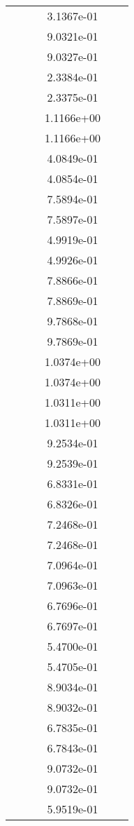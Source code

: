 \begin{xltabular}{\textwidth}{r|rS[table-format=1.3e+2]S[table-format=1.4e+2]S[table-format=1.4e+2]S[table-format=-1.5]}
&  &  & 3.1367e-01 & & \\
&  &  & 9.0321e-01 & & \\
&  &  & 9.0327e-01 & & \\
&  &  & 2.3384e-01 & & \\
&  &  & 2.3375e-01 & & \\
&  &  & 1.1166e+00 & & \\
&  &  & 1.1166e+00 & & \\
&  &  & 4.0849e-01 & & \\
&  &  & 4.0854e-01 & & \\
&  &  & 7.5894e-01 & & \\
&  &  & 7.5897e-01 & & \\
&  &  & 4.9919e-01 & & \\
&  &  & 4.9926e-01 & & \\
&  &  & 7.8866e-01 & & \\
&  &  & 7.8869e-01 & & \\
&  &  & 9.7868e-01 & & \\
&  &  & 9.7869e-01 & & \\
&  &  & 1.0374e+00 & & \\
&  &  & 1.0374e+00 & & \\
&  &  & 1.0311e+00 & & \\
&  &  & 1.0311e+00 & & \\
&  &  & 9.2534e-01 & & \\
&  &  & 9.2539e-01 & & \\
&  &  & 6.8331e-01 & & \\
&  &  & 6.8326e-01 & & \\
&  &  & 7.2468e-01 & & \\
&  &  & 7.2468e-01 & & \\
&  &  & 7.0964e-01 & & \\
&  &  & 7.0963e-01 & & \\
&  &  & 6.7696e-01 & & \\
&  &  & 6.7697e-01 & & \\
&  &  & 5.4700e-01 & & \\
&  &  & 5.4705e-01 & & \\
&  &  & 8.9034e-01 & & \\
&  &  & 8.9032e-01 & & \\
&  &  & 6.7835e-01 & & \\
&  &  & 6.7843e-01 & & \\
&  &  & 9.0732e-01 & & \\
&  &  & 9.0732e-01 & & \\
&  &  & 5.9519e-01 & & \\

\end{xltabular}
